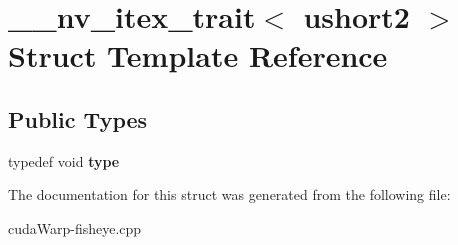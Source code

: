 \hypertarget{struct____nv__itex__trait_3_01ushort2_01_4}{}\section{\+\_\+\+\_\+nv\+\_\+itex\+\_\+trait$<$ ushort2 $>$ Struct Template Reference}
\label{struct____nv__itex__trait_3_01ushort2_01_4}
\subsection*{Public Types}
\begin{DoxyCompactItemize}
\item 
typedef void {\bfseries type}\hypertarget{struct____nv__itex__trait_3_01ushort2_01_4_ac2d48cff8e10d2be134447522aa8180d}{}\label{struct____nv__itex__trait_3_01ushort2_01_4_ac2d48cff8e10d2be134447522aa8180d}

\end{DoxyCompactItemize}


The documentation for this struct was generated from the following file\+:\begin{DoxyCompactItemize}
\item 
cuda\+Warp-\/fisheye.\+cpp\end{DoxyCompactItemize}
